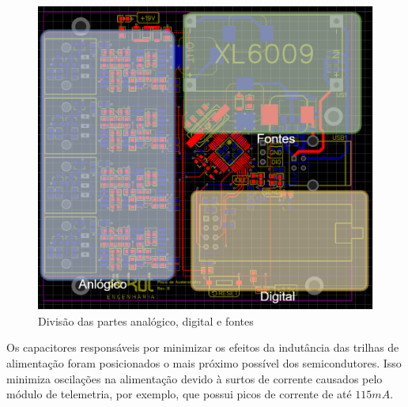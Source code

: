 \documentclass[
	12pt,				%
	openright,			%
	twoside,			%
	a4paper,			%
	english,			%
	french,				%
	spanish,			%
	brazil,				%
	]{abntex2}
\begin{document}
			\begin{figure}[ht]
				\centering
				\includegraphics[scale=0.3]{../Fotos/analogDigitalFonte.png}
				\caption{Divisão das partes analógico, digital e fontes}
				\label{fig:analogDigitalFontes}
			\end{figure}

			Os capacitores responsáveis por minimizar os efeitos da
			indutância das trilhas de alimentação foram posicionados o mais
			próximo possível dos semicondutores. Isso minimiza oscilações na
			alimentação devido à surtos de corrente causados pelo módulo de
			telemetria, por exemplo, que possui picos de corrente de até $115mA$.
\end{document}
